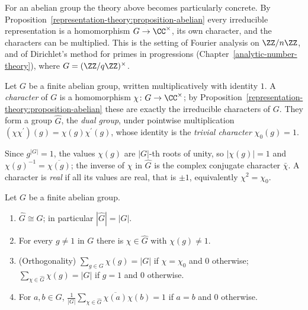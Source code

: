 For an abelian group the theory above becomes particularly concrete. By Proposition~\ref{representation-theory:proposition-abelian} every irreducible representation is a homomorphism
$G \to \CC^\times$, its own character, and the characters can be multiplied. This is the setting of Fourier analysis on $\ZZ/n\ZZ$, and of Dirichlet's method for primes in progressions
(Chapter~\ref{analytic-number-theory}), where $G = (\ZZ/q\ZZ)^\times$.

\begin{definition}\label{representation-theory:definition-dual-group}
Let $G$ be a finite abelian group, written multiplicatively with identity $1$. A \emph{character} of $G$ is a homomorphism $\chi \colon G \to \CC^\times$; by
Proposition~\ref{representation-theory:proposition-abelian} these are exactly the irreducible characters of $G$. They form a group $\widehat G$, the \emph{dual group}, under pointwise multiplication
$(\chi\chi^{\prime})(g) = \chi(g)\chi^{\prime}(g)$, whose identity is the \emph{trivial character} $\chi_0(g) = 1$.
\end{definition}

\begin{notation}\label{representation-theory:notation-dual-group}
Since $g^{|G|} = 1$, the values $\chi(g)$ are $|G|$-th roots of unity, so $|\chi(g)| = 1$ and $\chi(g)^{-1} = \overline{\chi(g)}$; the inverse of $\chi$ in $\widehat G$ is the complex conjugate
character $\bar\chi$. A character is \emph{real} if all its values are real, that is $\pm1$, equivalently $\chi^2 = \chi_0$.
\end{notation}

\begin{proposition}\label{representation-theory:proposition-dual-group}
Let $G$ be a finite abelian group.
\begin{enumerate}
\item $\widehat G \cong G$; in particular $|\widehat G| = |G|$.
\item For every $g \neq 1$ in $G$ there is $\chi \in \widehat G$ with $\chi(g) \neq 1$.
\item (Orthogonality) $\sum_{g \in G}\chi(g) = |G|$ if $\chi = \chi_0$ and $0$ otherwise; $\sum_{\chi \in \widehat G}\chi(g) = |G|$ if $g = 1$ and $0$ otherwise.
\item For $a, b \in G$, $\frac{1}{|G|}\sum_{\chi \in \widehat G}\overline{\chi(a)}\chi(b) = 1$ if $a = b$ and $0$ otherwise.
\end{enumerate}
\end{proposition}

